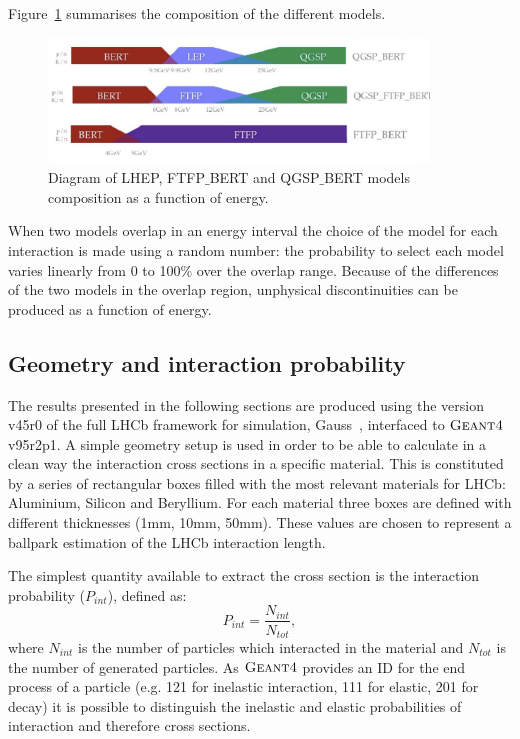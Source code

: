 Figure~\ref{fig:models} summarises the composition of the different models.
%
\begin{center}
\begin{figure}[b]
\centering \includegraphics[width=0.9\textwidth]{detector/figs/validation/models.png}
\caption{Diagram of LHEP, FTFP$\_$BERT and QGSP$\_$BERT models composition as a function of energy.}
\label{fig:models}
\end{figure}
\end{center}
%
When two models overlap in an energy interval the choice of the model
for each interaction is made using a random number: the probability to select each model varies linearly
from 0 to 100\% over the overlap range. Because of the differences of the two models in the overlap region,
unphysical discontinuities can be produced as a function of energy.

\subsection{Geometry and interaction probability}
\label{GeomandPint}

The results presented in the following sections are produced using the version v45r0 of the full LHCb framework
for simulation, Gauss~\cite{LHCb-PROC-2011-006}, interfaced to $\textsc{Geant4}$ v95r2p1.
A simple geometry setup is used in order to be able to calculate in a clean way the interaction cross sections
in a specific material. This is constituted by a series of rectangular boxes filled with the most relevant materials
for LHCb: Aluminium, Silicon and Beryllium. For each material three boxes are defined with different thicknesses
(1mm, 10mm, 50mm). These values are chosen to represent a ballpark estimation of the LHCb interaction length.

The simplest quantity available to extract the cross section is the interaction probability ($P_{int}$), defined as:
%
\begin{equation}
P_{int} = \frac{N_{int}}{N_{tot}},
\end{equation}
%
where $N_{int}$ is the number of particles which interacted in the material and $N_{tot}$ is the number of generated particles.
As $\textsc{Geant4}$ provides an ID for the end process of a particle (e.g. 121 for inelastic interaction, 111 for elastic, 
201 for decay) it is possible to distinguish the inelastic and elastic probabilities of interaction and therefore cross sections.

